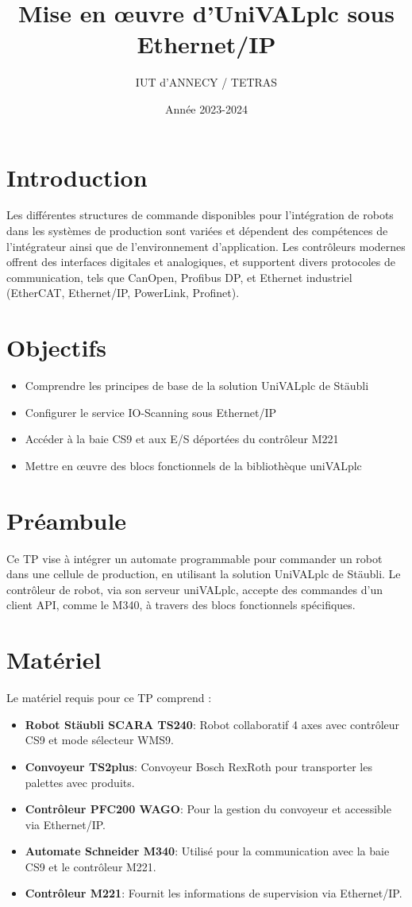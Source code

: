 \documentclass{UPSTI_Document}
\title{Mise en œuvre d’UniVALplc sous Ethernet/IP}
\author{IUT d'ANNECY / TETRAS}
\date{Année 2023-2024}
\begin{document}
\maketitle

\section{Introduction}
Les différentes structures de commande disponibles pour l'intégration de robots dans les systèmes de production 
sont variées et dépendent des compétences de l'intégrateur ainsi que de l'environnement d'application. Les 
contrôleurs modernes offrent des interfaces digitales et analogiques, et supportent divers protocoles de 
communication, tels que CanOpen, Profibus DP, et Ethernet industriel (EtherCAT, Ethernet/IP, PowerLink, Profinet).

\section{Objectifs}
\begin{itemize}
    \item Comprendre les principes de base de la solution UniVALplc de Stäubli
    \item Configurer le service IO-Scanning sous Ethernet/IP
    \item Accéder à la baie CS9 et aux E/S déportées du contrôleur M221
    \item Mettre en œuvre des blocs fonctionnels de la bibliothèque uniVALplc
\end{itemize}

\section{Préambule}
Ce TP vise à intégrer un automate programmable pour commander un robot dans une cellule de production, en utilisant la solution UniVALplc de Stäubli. 
Le contrôleur de robot, via son serveur uniVALplc, accepte des commandes d’un client API, comme le M340, à travers des blocs fonctionnels 
spécifiques.

\section{Matériel}
Le matériel requis pour ce TP comprend :
\begin{itemize}
    \item \textbf{Robot Stäubli SCARA TS240}: Robot collaboratif 4 axes avec contrôleur CS9 et mode sélecteur WMS9.
    \item \textbf{Convoyeur TS2plus}: Convoyeur Bosch RexRoth pour transporter les palettes avec produits.
    \item \textbf{Contrôleur PFC200 WAGO}: Pour la gestion du convoyeur et accessible via Ethernet/IP.
    \item \textbf{Automate Schneider M340}: Utilisé pour la communication avec la baie CS9 et le contrôleur M221.
    \item \textbf{Contrôleur M221}: Fournit les informations de supervision via Ethernet/IP.
\end{itemize}
\end{document}
